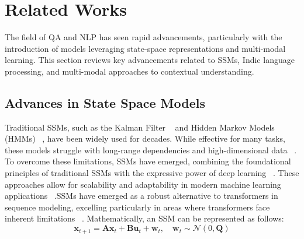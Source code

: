 \section{Related Works}
\label{sec:related}

The field of QA and NLP has seen rapid advancements, particularly with the introduction of models leveraging state-space representations and multi-modal learning. This section reviews key advancements related to SSMs, Indic language processing, and multi-modal approaches to contextual understanding.

\subsection{Advances in State Space Models}
Traditional SSMs, such as the Kalman Filter ~\cite{kalman1960new} and Hidden Markov Models (HMMs) ~\cite{rabiner1986hmm}, have been widely used for decades. While effective for many tasks, these models struggle with long-range dependencies and high-dimensional data ~\cite{bourdois2022ssm}. To overcome these limitations, SSMs have emerged, combining the foundational principles of traditional SSMs with the expressive power of deep learning ~\cite{sarrof2024expressivecapacitystatespace}. These approaches allow for scalability and adaptability in modern machine learning applications ~\cite{goel2022s4}.SSMs have emerged as a robust alternative to transformers in sequence modeling, excelling particularly in areas where transformers face inherent limitations ~\cite{patro2024heracleshybridssmtransformermodel}. Mathematically, an SSM can be represented as follows:
\begin{equation}
    {
        \mathbf{x}_{t+1} = \mathbf{A} \mathbf{x}_t + \mathbf{B} \mathbf{u}_t + \mathbf{w}_t, \quad \mathbf{w}_t \sim \mathcal{N}(0, \mathbf{Q})
    } 
    \label{eq:ssm_equations}
\end{equation}

